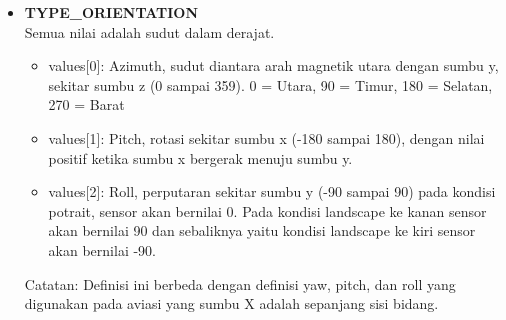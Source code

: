 \begin{itemize}
\item \textbf{TYPE\_ORIENTATION}\\
Semua nilai adalah sudut dalam derajat.
\begin{itemize}
	\item values[0]: Azimuth, sudut diantara arah magnetik utara dengan sumbu y, sekitar sumbu z (0 sampai 359). 0 = Utara, 90 = Timur, 180 = Selatan, 270 = Barat
	\item values[1]: Pitch, rotasi sekitar sumbu x (-180 sampai 180), dengan nilai positif ketika sumbu x bergerak menuju sumbu y.
	\item values[2]: Roll, perputaran sekitar sumbu y (-90 sampai 90) pada kondisi potrait, sensor akan bernilai 0. Pada kondisi landscape ke kanan sensor akan bernilai 90 dan sebaliknya yaitu kondisi landscape ke kiri sensor akan bernilai -90.
\end{itemize}

Catatan: Definisi ini berbeda dengan definisi yaw, pitch, dan roll yang digunakan pada aviasi yang sumbu X adalah sepanjang sisi bidang.


\end{itemize}
